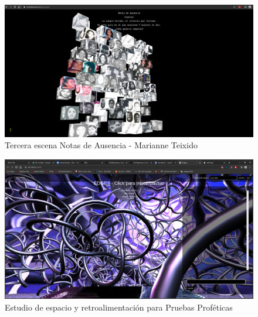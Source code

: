 \begin{figure}
  \includegraphics[width=\textwidth]{img/notas04.png}
  \caption{Tercera escena Notas de Ausencia - Marianne Teixido}
  \label{fig:notas3}

\end{figure}




\begin{figure}
  \includegraphics[width=\textwidth]{img/pruebas3.png}
  \caption{Estudio de espacio y retroalimentación para Pruebas Proféticas}
\end{figure}

